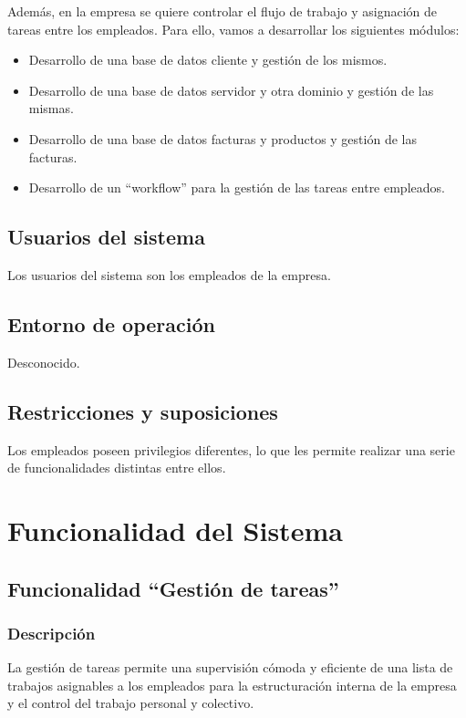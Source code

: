 \documentclass[paper=a4, fontsize=11pt, spanish]{scrartcl}
\begin{document}
Además, en la empresa se quiere controlar el flujo de trabajo y asignación de tareas entre los empleados.
Para ello, vamos a desarrollar los siguientes módulos:
\begin{itemize}
\item Desarrollo de una base de datos cliente y gestión de los mismos.
\item Desarrollo de una base de datos servidor y otra dominio y gestión de las mismas.
\item Desarrollo de una base de datos facturas y productos y gestión de las facturas.
\item Desarrollo de un “workflow” para la gestión de las tareas entre empleados.
\end{itemize}

\subsection{Usuarios del sistema}
\setlength{\parindent}{0em}Los usuarios del sistema son los empleados de la empresa.

\subsection{Entorno de operación}
\setlength{\parindent}{3em} Desconocido.

\subsection{Restricciones y suposiciones}
\setlength{\parindent}{3em} Los empleados poseen privilegios diferentes, lo que les permite realizar una serie de funcionalidades distintas entre ellos.

\section{Funcionalidad del Sistema}

\subsection{Funcionalidad “Gestión de tareas”}

\subsubsection{Descripción}
\setlength{\parindent}{3em} La gestión de tareas permite una supervisión cómoda y eficiente de una lista de trabajos asignables a los empleados para la estructuración interna de la empresa y el control del trabajo personal y colectivo.
\end{document}
